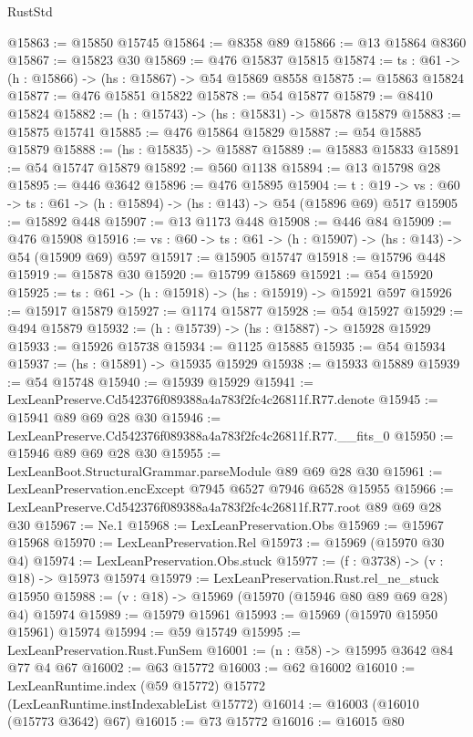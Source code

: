 \begin{lexlean}{RustStd}
\begin{coremodule}
@15863 := @15850 @15745
@15864 := @8358 @89
@15866 := @13 @15864 @8360
@15867 := @15823 @30
@15869 := @476 @15837 @15815
@15874 := {ts : @61} -> (h : @15866) -> (hs : @15867) -> @54 @15869 @8558
@15875 := @15863 @15824
@15877 := @476 @15851 @15822
@15878 := @54 @15877
@15879 := @8410 @15824
@15882 := (h : @15743) -> (hs : @15831) -> @15878 @15879
@15883 := @15875 @15741
@15885 := @476 @15864 @15829
@15887 := @54 @15885 @15879
@15888 := (hs : @15835) -> @15887
@15889 := @15883 @15833
@15891 := @54 @15747 @15879
@15892 := @560 @1138
@15894 := @13 @15798 @28
@15895 := @446 @3642
@15896 := @476 @15895
@15904 := {t : @19} ->
  {vs : @60} -> {ts : @61} -> (h : @15894) -> (hs : @143) -> @54 (@15896 @69) @517
@15905 := @15892 @448
@15907 := @13 @1173 @448
@15908 := @446 @84
@15909 := @476 @15908
@15916 := {vs : @60} -> {ts : @61} -> (h : @15907) -> (hs : @143) -> @54 (@15909 @69) @597
@15917 := @15905 @15747
@15918 := @15796 @448
@15919 := @15878 @30
@15920 := @15799 @15869
@15921 := @54 @15920
@15925 := {ts : @61} -> (h : @15918) -> (hs : @15919) -> @15921 @597
@15926 := @15917 @15879
@15927 := @1174 @15877
@15928 := @54 @15927
@15929 := @494 @15879
@15932 := (h : @15739) -> (hs : @15887) -> @15928 @15929
@15933 := @15926 @15738
@15934 := @1125 @15885
@15935 := @54 @15934
@15937 := (hs : @15891) -> @15935 @15929
@15938 := @15933 @15889
@15939 := @54 @15748
@15940 := @15939 @15929
@15941 := LexLeanPreserve.Cd542376f089388a4a783f2fc4c26811f.R77.denote
@15945 := @15941 @89 @69 @28 @30
@15946 := LexLeanPreserve.Cd542376f089388a4a783f2fc4c26811f.R77.__fits_0
@15950 := @15946 @89 @69 @28 @30
@15955 := LexLeanBoot.StructuralGrammar.parseModule @89 @69 @28 @30
@15961 := LexLeanPreservation.encExcept @7945 @6527 @7946 @6528 @15955
@15966 := LexLeanPreserve.Cd542376f089388a4a783f2fc4c26811f.R77.root @89 @69 @28 @30
@15967 := Ne.{1}
@15968 := LexLeanPreservation.Obs
@15969 := @15967 @15968
@15970 := LexLeanPreservation.Rel
@15973 := @15969 (@15970 @30 @4)
@15974 := LexLeanPreservation.Obs.stuck
@15977 := (f : @3738) -> (v : @18) -> @15973 @15974
@15979 := LexLeanPreservation.Rust.rel_ne_stuck @15950
@15988 := (v : @18) -> @15969 (@15970 (@15946 @80 @89 @69 @28) @4) @15974
@15989 := @15979 @15961
@15993 := @15969 (@15970 @15950 @15961) @15974
@15994 := @59 @15749
@15995 := LexLeanPreservation.Rust.FunSem
@16001 := (n : @58) -> @15995 @3642 @84 @77 @4 @67
@16002 := @63 @15772
@16003 := @62 @16002
@16010 := LexLeanRuntime.index (@59 @15772) @15772 (LexLeanRuntime.instIndexableList @15772)
@16014 := @16003 (@16010 (@15773 @3642) @67)
@16015 := @73 @15772
@16016 := @16015 @80

\end{coremodule}
\end{lexlean}
